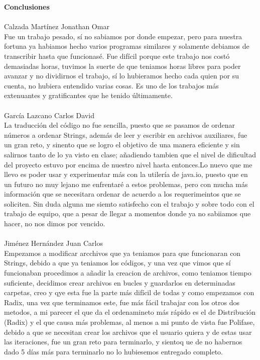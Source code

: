 \documentclass[12pt,a4paper]{article}
\begin{document}
	
	\newpage
	\Large \textbf{Conclusiones}
	\\
	\\
	\large Calzada Martínez Jonathan Omar
	\\
	\normalsize Fue un trabajo pesado, sí no sabiamos por donde empezar, pero para nuestra fortuna ya habiamos hecho varios programas similares y solamente debiamos de transcribir hasta que funcionasé. Fue difícil porque este trabajo nos costó demasiadas horas, tuvimos la suerte de que teniamos horas libres para poder avanzar y no dividirnos el trabajo, sí lo hubieramos hecho cada quien por su cuenta, no hubiera entendido varias cosas. Es uno de los trabajos más extenuantes y gratificantes que he tenido últimamente.
	\\
	\\
	\large García Lazcano Carlos David
	\\
	\normalsize La traducción del código no fue sencilla, puesto que se pasamos de ordenar números a ordenar Strings, además de leer y escribir en archivos auxiliares, fue un gran reto, y sinento que se logro el objetivo de una manera eficiente y sin salirnos tanto de lo ya visto en clase; añadiendo tambien que el nivel de dificultad del proyecto estuvo por encima de nuestro nivel hasta entonces.Lo nuevo que me llevo es poder usar y experimentar más con la utilería de java.io, puesto que en un futuro no muy lejano me enfrentaré a estos problemas, pero con mucha más información que se necesitara ordenar de acuerdo a los requerimeintos que se soliciten. Sin duda alguna me siemto satisfecho con el trabajo y sobre todo con el trabajo de equipo, que a pesar de llegar a momentos donde ya no sabiiamos que hacer, no nos dimos por vencido.
	\\
	\\
	\large Jiménez Hernández Juan Carlos
	\\
	\normalsize Empezamos a modificar arcchivos que ya teniamos para que funcionaran con Strings, debido a que ya teniamos los códigos, y una vez que vimos que sí funcionaban procedimos a añadir la creacion de archivos, como teniamos tiempo suficiente, decidimos crear archivos en bucles y guardarlos en determinadas carpetas, creo y qye esta fue la parte más difícil de todas y como empezamos con Radix, una vez que terminamos este, fue más fácil trabajar con los otros dos metodos, a mi parecer el que da el ordenamineto más rápido es el de Distribución (Radix) y el que causa más problemas, al menos a mi punto de vista fue Polifase, debido a que se necesitan crear los archivos que el usuario quiera y de estas usar las iteraciones, fue un gran reto para terminarlo, y sientoq ue de no habernos dado 5 días más para terminarlo no lo hubiesemos entregado completo.
\end{document}

